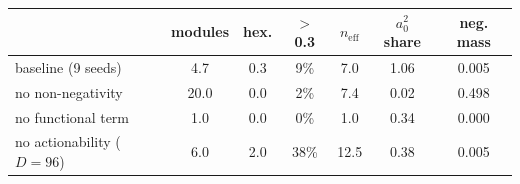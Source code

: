 \begin{tabular}{lcccccc}
\toprule
& modules & hex. & $>$0.3 & $n_\mathrm{eff}$ & $a_0^2$ share & neg. mass \\
\midrule
baseline (9 seeds) & 4.7 & 0.3 & 9\% & 7.0 & 1.06 & 0.005 \\
no non-negativity & 20.0 & 0.0 & 2\% & 7.4 & 0.02 & 0.498 \\
no functional term & 1.0 & 0.0 & 0\% & 1.0 & 0.34 & 0.000 \\
no actionability ($D{=}96$) & 6.0 & 2.0 & 38\% & 12.5 & 0.38 & 0.005 \\
\bottomrule
\end{tabular}
